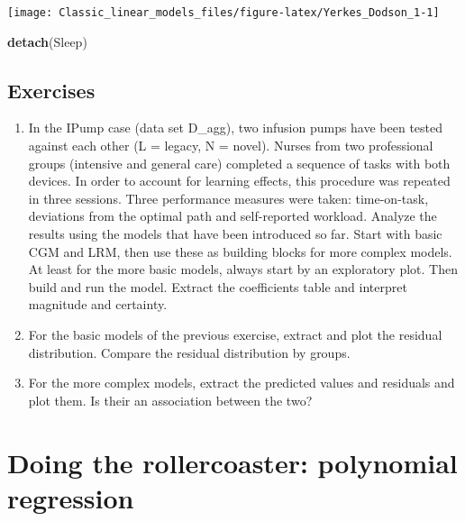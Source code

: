 \documentclass[]{svmono}
\newenvironment{Shaded}{\begin{snugshade}}{\end{snugshade}}
\newcommand{\KeywordTok}[1]{\textcolor[rgb]{0.13,0.29,0.53}{\textbf{#1}}}
\newcommand{\NormalTok}[1]{#1}
\begin{document}
\texttt{[image: Classic\_linear\_models\_files/figure-latex/Yerkes\_Dodson\_1-1]}

\begin{Shaded}
\begin{Highlighting}[]
\KeywordTok{detach}\NormalTok{(Sleep)}
\end{Highlighting}
\end{Shaded}

\subsection{Exercises}\label{exercises-5}

\begin{enumerate}
\def\labelenumi{\arabic{enumi}.}
\item
  In the IPump case (data set D\_agg), two infusion pumps have been
  tested against each other (L = legacy, N = novel). Nurses from two
  professional groups (intensive and general care) completed a sequence
  of tasks with both devices. In order to account for learning effects,
  this procedure was repeated in three sessions. Three performance
  measures were taken: time-on-task, deviations from the optimal path
  and self-reported workload. Analyze the results using the models that
  have been introduced so far. Start with basic CGM and LRM, then use
  these as building blocks for more complex models. At least for the
  more basic models, always start by an exploratory plot. Then build and
  run the model. Extract the coefficients table and interpret magnitude
  and certainty.
\item
  For the basic models of the previous exercise, extract and plot the
  residual distribution. Compare the residual distribution by groups.
\item
  For the more complex models, extract the predicted values and
  residuals and plot them. Is their an association between the two?
\end{enumerate}

\section{Doing the rollercoaster: polynomial
regression}\label{polynomial_regression}
\end{document}
